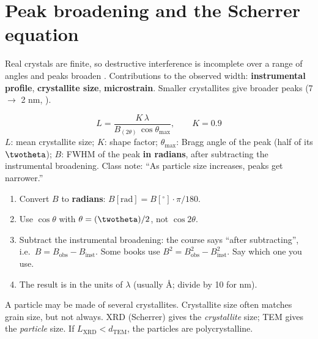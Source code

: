 \section{Peak broadening and the Scherrer equation}
Real crystals are finite, so destructive interference is incomplete over a range of angles and peaks broaden
. Contributions to the observed width: \textbf{instrumental profile}, \textbf{crystallite size},
\textbf{microstrain}. Smaller crystallites give broader peaks (7 $\to$ 2 nm, ).
\begin{keybox}
\begin{equation}
\boxed{L = \frac{K\,\lambda}{B_{(2\theta)}\,\cos\theta_\mathrm{max}}}, \qquad K = 0.9
\label{eq:scherrer}
\end{equation}
$L$: mean crystallite size; $K$: shape factor; $\theta_\mathrm{max}$: Bragg angle of the peak (half of its $\twotheta$);
$B$: FWHM of the peak \textbf{in radians}, after subtracting the instrumental broadening.
Class note: ``As particle size increases, peaks get narrower.''
\end{keybox}
\begin{pitfall}
\begin{enumerate}
  \item Convert $B$ to \textbf{radians}: $B[\mathrm{rad}] = B[^\circ]\cdot\pi/180$.
  \item Use $\cos\theta$ with $\theta = (\twotheta)/2$, not $\cos 2\theta$.
  \item Subtract the instrumental broadening: the course says ``after subtracting'', i.e.\ $B = B_\mathrm{obs}-B_\mathrm{inst}$.
        Some books use $B^2 = B_\mathrm{obs}^2 - B_\mathrm{inst}^2$\extra. Say which one you use.
  \item The result is in the units of $\lambda$ (usually \AA; divide by 10 for nm).
\end{enumerate}
\end{pitfall}
\begin{keybox}
A particle may be made of several crystallites. Crystallite size often matches grain size, but not always.
XRD (Scherrer) gives the \emph{crystallite} size; TEM gives the \emph{particle} size. If $L_\mathrm{XRD} < d_\mathrm{TEM}$,
the particles are polycrystalline.
\end{keybox}

